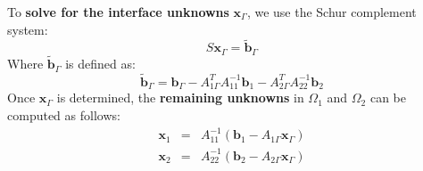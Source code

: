 To \textbf{solve for the interface unknowns} $\mathbf{x}_{\Gamma}$, we use the Schur complement system:
\begin{equation*}
    S \mathbf{x}_{\Gamma} = \widetilde{\mathbf{b}}_{\Gamma}
\end{equation*}
Where $\widetilde{\mathbf{b}}_{\Gamma}$ is defined as:
\begin{equation*}
    \widetilde{\mathbf{b}}_{\Gamma} = \mathbf{b}_{\Gamma} - A_{1\Gamma}^{T} A_{11}^{-1} \mathbf{b}_{1} - A_{2\Gamma}^{T} A_{22}^{-1} \mathbf{b}_{2}
\end{equation*}
Once $\mathbf{x}_{\Gamma}$ is determined, the \textbf{remaining unknowns} in $\Omega_{1}$ and $\Omega_{2}$ can be computed as follows:
\begin{equation*}
    \begin{array}{rcl}
        \mathbf{x}_{1} &=& A_{11}^{-1} (\mathbf{b}_{1} - A_{1\Gamma} \mathbf{x}_{\Gamma}) \\ [.8em]
        \mathbf{x}_{2} &=& A_{22}^{-1} (\mathbf{b}_{2} - A_{2\Gamma} \mathbf{x}_{\Gamma})
    \end{array}
\end{equation*}

